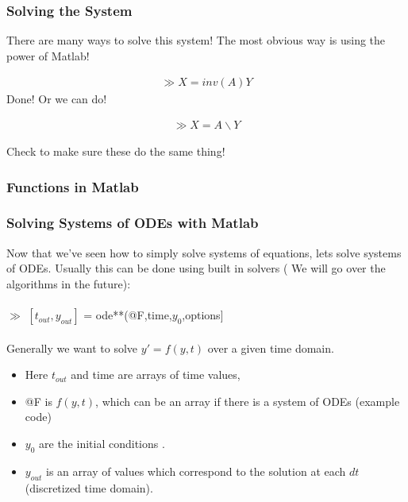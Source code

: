 \documentclass{beamer}
\begin{document}
\begin{frame}
\frametitle{Solving the System}

There are many ways to solve this system! The most obvious way is using the power of Matlab!

\begin{align*}
 \gg X = inv(A) Y
 \end{align*}
Done! Or we can do! 

\begin{align*}
 \gg X = A\backslash Y
 \end{align*}
 
Check to make sure these do the same thing! 

\end{frame}
%
\begin{frame}
\frametitle{Functions in Matlab} 


\end{frame} 
%
\begin{frame}
\frametitle{Solving Systems of ODEs with Matlab}

Now that we've seen how to simply solve systems of equations, lets solve systems of ODEs. Usually this can be done using built in solvers ( We will go over the algorithms in the future):\\
\ \\ 

$\gg$ $[t_{out},y_{out}]$ = ode**(@F,time,$y_0$,options]\\
\ \\
Generally we want to solve $y' = f(y,t)$ over a given time domain. 
\begin{itemize}
\item Here $t_{out}$ and time are arrays of time values, 
\item @F is $f(y,t)$, which can be an array if there is a system of ODEs (example code)
\item $y_0$ are the initial conditions .  
\item $y_{out}$ is an array of values which correspond to the solution at each $dt$ (discretized time domain). 
\end{itemize}

\end{frame}
\end{document}
